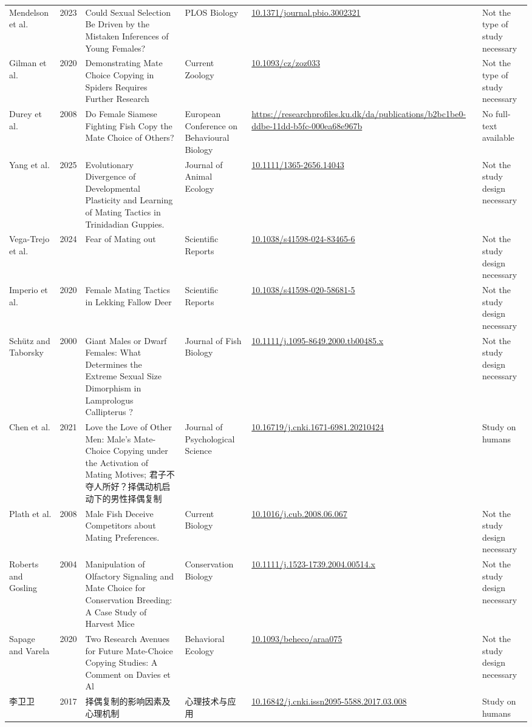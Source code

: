 \begin{landscape}
{\begin{longtable}{>{\raggedright\arraybackslash}p{2.3cm} l >{\raggedright\arraybackslash}p{4.3cm} >{\raggedright\arraybackslash}p{2.6cm} >{\raggedright\arraybackslash}p{3.0cm} >{\raggedright\arraybackslash}p{2.5cm}}
Mendelson et al. & 2023 & Could Sexual Selection Be Driven by the Mistaken Inferences of Young Females? & PLOS Biology & \url{10.1371/journal.pbio.3002321} & Not the type of study necessary \\
Gilman et al. & 2020 & Demonstrating Mate Choice Copying in Spiders Requires Further Research & Current Zoology & \url{10.1093/cz/zoz033} & Not the type of study necessary \\
Durey et al. & 2008 & Do Female Siamese Fighting Fish Copy the Mate Choice of Others? & European Conference on Behavioural Biology & \url{https://researchprofiles.ku.dk/da/publications/b2bc1be0-ddbe-11dd-b5fc-000ea68e967b} & No full-text available \\
Yang et al. & 2025 & Evolutionary Divergence of Developmental Plasticity and Learning of Mating Tactics in Trinidadian Guppies. & Journal of Animal Ecology & \url{10.1111/1365-2656.14043} & Not the study design necessary \\
Vega-Trejo et al. & 2024 & Fear of Mating out & Scientific Reports & \url{10.1038/s41598-024-83465-6} & Not the study design necessary \\
Imperio et al. & 2020 & Female Mating Tactics in Lekking Fallow Deer & Scientific Reports & \url{10.1038/s41598-020-58681-5} & Not the study design necessary \\
Schütz and Taborsky & 2000 & Giant Males or Dwarf Females: What Determines the Extreme Sexual Size Dimorphism in Lamprologus Callipterus ? & Journal of Fish Biology & \url{10.1111/j.1095-8649.2000.tb00485.x} & Not the study design necessary \\
Chen  et al. & 2021 & Love the Love of Other Men: Male's Mate-Choice Copying under the Activation of Mating Motives; 君子不夺人所好？择偶动机启动下的男性择偶复制 & Journal of Psychological Science & \url{10.16719/j.cnki.1671-6981.20210424} & Study on humans \\
Plath et al. & 2008 & Male Fish Deceive Competitors about Mating Preferences. & Current Biology & \url{10.1016/j.cub.2008.06.067} & Not the study design necessary \\
Roberts and Gosling & 2004 & Manipulation of Olfactory Signaling and Mate Choice for Conservation Breeding: A Case Study of Harvest Mice & Conservation Biology & \url{10.1111/j.1523-1739.2004.00514.x} & Not the study design necessary \\
Sapage and Varela & 2020 & Two Research Avenues for Future Mate-Choice Copying Studies: A Comment on Davies et Al & Behavioral Ecology & \url{10.1093/beheco/araa075} & Not the study design necessary \\
李卫卫 & 2017 & 择偶复制的影响因素及心理机制 & 心理技术与应用 & \url{10.16842/j.cnki.issn2095-5588.2017.03.008} & Study on humans \\
\end{longtable}
}
\end{landscape}
